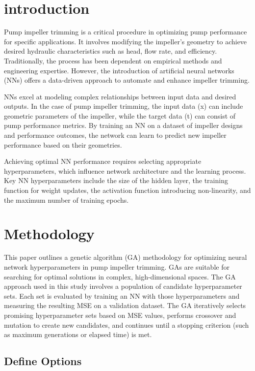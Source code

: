 \documentclass[
  super,
  review,
  3p]{elsarticle}
\begin{document}
\section{introduction}\label{introduction}

Pump impeller trimming is a critical procedure in optimizing pump
performance for specific applications. It involves modifying the
impeller's geometry to achieve desired hydraulic characteristics such as
head, flow rate, and efficiency. Traditionally, the process has been
dependent on empirical methods and engineering expertise. However, the
introduction of artificial neural networks (NNs) offers a data-driven
approach to automate and enhance impeller trimming.

NNs excel at modeling complex relationships between input data and
desired outputs. In the case of pump impeller trimming, the input data
(x) can include geometric parameters of the impeller, while the target
data (t) can consist of pump performance metrics. By training an NN on a
dataset of impeller designs and performance outcomes, the network can
learn to predict new impeller performance based on their geometries.

Achieving optimal NN performance requires selecting appropriate
hyperparameters, which influence network architecture and the learning
process. Key NN hyperparameters include the size of the hidden layer,
the training function for weight updates, the activation function
introducing non-linearity, and the maximum number of training epochs.

\section{Methodology}\label{methodology}

This paper outlines a genetic algorithm (GA) methodology for optimizing
neural network hyperparameters in pump impeller trimming. GAs are
suitable for searching for optimal solutions in complex,
high-dimensional spaces. The GA approach used in this study involves a
population of candidate hyperparameter sets. Each set is evaluated by
training an NN with those hyperparameters and measuring the resulting
MSE on a validation dataset. The GA iteratively selects promising
hyperparameter sets based on MSE values, performs crossover and mutation
to create new candidates, and continues until a stopping criterion (such
as maximum generations or elapsed time) is met.

\subsection{Define Options}\label{define-options}
\end{document}
